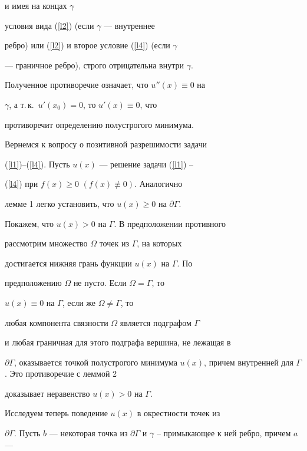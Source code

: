 {{{{{{{\begin{pf}
и имея на концах $\gamma$


условия вида (\ref{l2}) (если $\gamma$ --- внутреннее


ребро) или (\ref{l2}) и второе условие (\ref{l4}) (если $\gamma$


--- граничное ребро), строго отрицательна внутри $\gamma$.


Полученное противоречие означает, что $u''(x)\equiv 0$ на


$\gamma$, а т.\,к.~$u'(x_0)=0$, то $u'(x)\equiv 0$, что


противоречит определению полустрогого минимума.


\end{pf}





Вернемся к вопросу о позитивной разрешимости задачи


(\ref{l1})--(\ref{l4}). Пусть $u(x) $ --- решение задачи (\ref{l1}) --


(\ref{l4}) при $f(x)\geq 0$ $(f(x)\not\equiv 0) $. Аналогично


лемме 1 легко установить, что $u(x)\geq 0 $ на $\partial \Gamma$.


Покажем, что $u(x)>0$ на $\Gamma$. В предположении противного


рассмотрим множество $\Omega $ точек из $\Gamma$, на которых


достигается нижняя грань функции $u(x) $ на $\Gamma$. По


предположению $\Omega $ не пусто. Если $\Omega=\Gamma$, то


$u(x)\equiv 0 $ на $\Gamma $, если же $\Omega\ne\Gamma$, то


любая компонента связности $\Omega$ является подграфом $\Gamma $


и любая граничная для этого подграфа вершина, не лежащая в


$\partial \Gamma$, оказывается точкой полустрогого минимума $u(x)


$, причем внутренней для $\Gamma$. Это противоречие с леммой 2


доказывает неравенство $u(x)>0 $ на $\Gamma $.





Исследуем теперь поведение $u(x)$ в окрестности точек из


$\partial \Gamma$. Пусть $b $ --- некоторая точка из $\partial


\Gamma $ и $\gamma $ -- примыкающее к ней ребро, причем $a$ ---


}}}}}}}
